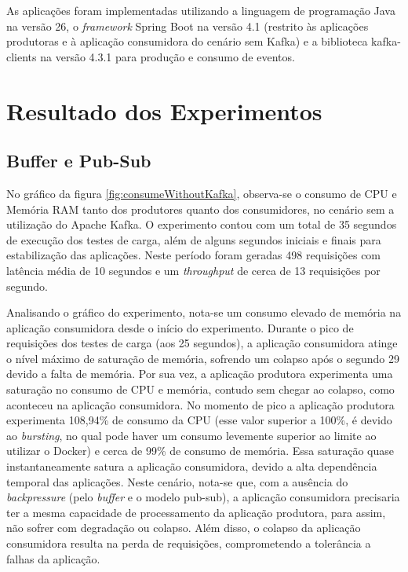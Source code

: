 \documentclass[12pt]{article}
\begin{document}
  As aplicações foram implementadas utilizando a linguagem de programação Java na versão 26, o \textit{framework} Spring Boot na versão 4.1 (restrito às aplicações produtoras e à aplicação consumidora do cenário sem Kafka) e a biblioteca kafka-clients na versão 4.3.1 para produção e consumo de eventos.

  \section{Resultado dos Experimentos}

  \subsection{Buffer e Pub-Sub}
  No gráfico da figura \ref{fig:consumeWithoutKafka}, observa-se o consumo de CPU e Memória RAM tanto dos produtores quanto dos consumidores, no cenário sem a utilização do Apache Kafka. O experimento contou com um total de 35 segundos de execução dos testes de carga, além de alguns segundos iniciais e finais para estabilização das aplicações. Neste período foram geradas 498 requisições com latência média de 10 segundos e um \textit{throughput} de cerca de 13 requisições por segundo.

  Analisando o gráfico do experimento, nota-se um consumo elevado de memória na aplicação consumidora desde o início do experimento. Durante o pico de requisições dos testes de carga (aos 25 segundos), a aplicação consumidora atinge o nível máximo de saturação de memória, sofrendo um colapso após o segundo 29 devido a falta de memória. Por sua vez, a aplicação produtora experimenta uma saturação no consumo de CPU e memória, contudo sem chegar ao colapso, como aconteceu na aplicação consumidora. No momento de pico a aplicação produtora experimenta 108,94\% de consumo da CPU (esse valor superior a 100\%, é devido ao \textit{bursting}, no qual pode haver um consumo levemente superior ao limite ao utilizar o Docker) e cerca de 99\% de consumo de memória. Essa saturação quase instantaneamente satura a aplicação consumidora, devido a alta dependência temporal das aplicações. Neste cenário, nota-se que, com a ausência do \textit{backpressure} (pelo \textit{buffer} e o modelo pub-sub), a aplicação consumidora precisaria ter a mesma capacidade de processamento da aplicação produtora, para assim, não sofrer com degradação ou colapso. Além disso, o colapso da aplicação consumidora resulta na perda de requisições, comprometendo a tolerância a falhas da aplicação.
\end{document}
